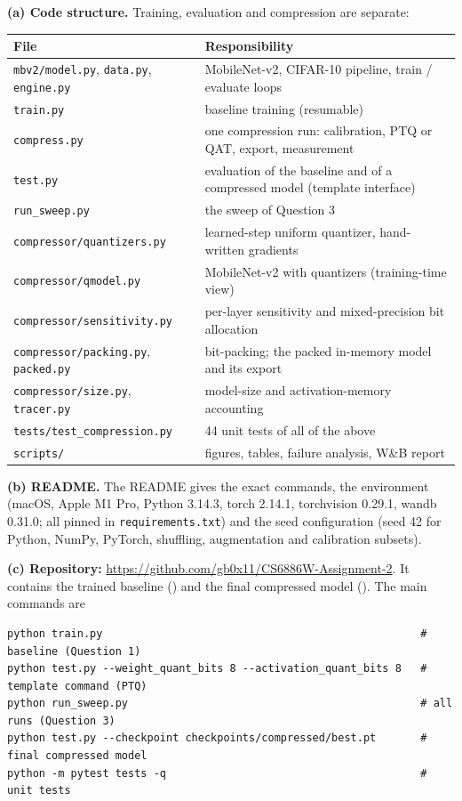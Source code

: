 \documentclass[11pt,a4paper]{article}
\newcommand{\repo}{\url{https://github.com/gb0x11/CS6886W-Assignment-2}}
\begin{document}
\textbf{(a) Code structure.} Training, evaluation and compression are separate:
\begin{center}
\footnotesize
\begin{tabular}{ll}
\toprule
File & Responsibility \\
\midrule
\texttt{mbv2/model.py}, \texttt{data.py}, \texttt{engine.py} & MobileNet-v2, CIFAR-10 pipeline, train / evaluate loops \\
\texttt{train.py} & baseline training (resumable) \\
\texttt{compress.py} & one compression run: calibration, PTQ or QAT, export, measurement \\
\texttt{test.py} & evaluation of the baseline and of a compressed model (template interface) \\
\texttt{run\_sweep.py} & the sweep of Question 3 \\
\texttt{compressor/quantizers.py} & learned-step uniform quantizer, hand-written gradients \\
\texttt{compressor/qmodel.py} & MobileNet-v2 with quantizers (training-time view) \\
\texttt{compressor/sensitivity.py} & per-layer sensitivity and mixed-precision bit allocation \\
\texttt{compressor/packing.py}, \texttt{packed.py} & bit-packing; the packed in-memory model and its export \\
\texttt{compressor/size.py}, \texttt{tracer.py} & model-size and activation-memory accounting \\
\texttt{tests/test\_compression.py} & 44 unit tests of all of the above \\
\texttt{scripts/} & figures, tables, failure analysis, W\&B report \\
\bottomrule
\end{tabular}
\end{center}

\textbf{(b) README.} The README gives the exact commands, the environment (macOS, Apple M1 Pro, Python 3.14.3, torch 2.14.1, torchvision 0.29.1, wandb 0.31.0; all pinned in \texttt{requirements.txt}) and the seed configuration (seed 42 for Python, NumPy, PyTorch, shuffling, augmentation and calibration subsets).

\textbf{(c) Repository:} \repo. It contains the trained baseline () and the final compressed model (). The main commands are
\begin{Verbatim}[frame=single,fontsize=\footnotesize]
python train.py                                                  # baseline (Question 1)
python test.py --weight_quant_bits 8 --activation_quant_bits 8   # template command (PTQ)
python run_sweep.py                                              # all runs (Question 3)
python test.py --checkpoint checkpoints/compressed/best.pt       # final compressed model
python -m pytest tests -q                                        # unit tests
\end{Verbatim}
\end{document}
